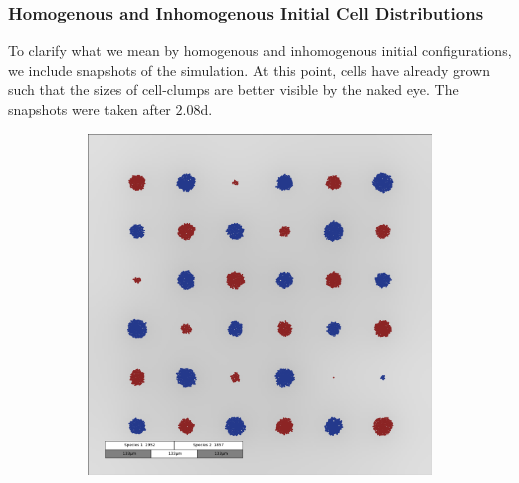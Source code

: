 \documentclass[10pt,twocolumn,5p]{elsarticle}
\numberwithin{equation}{section}
\begin{document}
\subsubsection{Homogenous and Inhomogenous Initial Cell Distributions}
To clarify what we mean by homogenous and inhomogenous initial configurations, we include snapshots of the simulation.
At this point, cells have already grown such that the sizes of cell-clumps are better visible by the naked eye.
The snapshots were taken after $2.08$\unit{\day}.
\begin{figure}
    \centering
    \begin{subfigure}[c]{0.5\textwidth}
        \includegraphics[width=\textwidth]{Figures/abm-homogenous/images/snapshot_00012000.png}
    \end{subfigure}%
    \begin{subfigure}[c]{0.5\textwidth}

\end{subfigure}
\end{figure}
\end{document}
